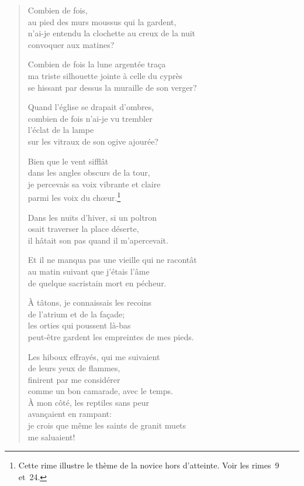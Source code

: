 \begin{verse}
  Combien de fois, \\
  au pied des murs moussus qui la gardent, \\
  n'ai-je entendu la clochette au creux de la nuit \\
  convoquer aux matines?

  Combien de fois la lune argentée traça \\
  ma triste silhouette jointe à celle du cyprès \\
  se hissant par dessus la muraille de son verger?

  Quand l'église se drapait d'ombres, \\
  combien de fois n'ai-je vu trembler \\
  l'éclat de la lampe \\
  sur les vitraux de son ogive ajourée?

  Bien que le vent sifflât \\
  dans les angles obscurs de la tour, \\
  je percevais sa voix vibrante et claire \\
  parmi les voix du chœur.\footnote{Cette rime illustre le thème de
  la novice hors d'atteinte. Voir les rimes~9 et~24.}

  Dans les nuits d'hiver, si un poltron \\
  osait traverser la place déserte, \\
  il hâtait son pas
  quand il m'apercevait.

  Et il ne manqua pas une vieille qui ne racontât \\
  au matin suivant
  que j'étais l'âme \\
  de quelque sacristain mort en pécheur.

  À tâtons, je connaissais les recoins \\
  de l'atrium et de la façade; \\
  les orties qui poussent là-bas \\
  peut-être gardent les empreintes de mes pieds.

  Les hiboux effrayés, qui me suivaient \\
  de leurs yeux de flammes, \\
  finirent par me considérer \\
  comme un bon camarade, avec le temps. \\

  À mon côté, les reptiles sans peur \\
  avançaient en rampant: \\
  je crois que même les saints de granit muets \\
  me saluaient!
\end{verse}

